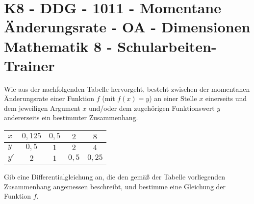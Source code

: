 \section{K8 - DDG - 1011 - Momentane Änderungsrate - OA - Dimensionen Mathematik 8 - Schularbeiten-Trainer}

\begin{beispiel}[K8 - DDG]{1}
Wie aus der nachfolgenden Tabelle hervorgeht, besteht zwischen der momentanen Änderungsrate einer Funktion $f$ (mit $f(x)=y$) an einer Stelle $x$ einerseits und dem jeweiligen Argument $x$ und/oder dem zugehörigen Funktionswert $y$ andererseits ein bestimmter Zusammenhang.

\begin{tabular}{|l|c|c|c|c|}\hline
\cellcolor[gray]{0.9}$x$&$0,125$&$0,5$&$2$&$8$\\ \hline
\cellcolor[gray]{0.9}$y$&$0,5$&$1$&$2$&$4$\\ \hline
\cellcolor[gray]{0.9}$y'$&$2$&$1$&$0,5$&$0,25$\\ \hline
\end{tabular}

Gib eine Differentialgleichung an, die den gemäß der Tabelle vorliegenden Zusammenhang angemessen beschreibt, und bestimme eine Gleichung der Funktion $f$.

\end{beispiel}